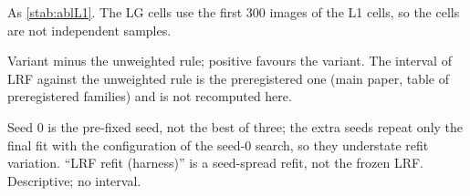 \documentclass[journal,onecolumn]{IEEEtran}
\theoremstyle{plain}
\begin{document}
\begin{table}[!htbp]
\centering
\caption{Exploratory Ablation: Accuracy and Difference From the Frozen LRF, LG Cells (the First 300 L1 Images)}
\label{stab:ablLG}
\scriptsize
\setlength{\tabcolsep}{3pt}
\resizebox{\textwidth}{!}{}

\vspace{2pt}
\parbox{\textwidth}{\scriptsize As \cref{stab:ablL1}. The LG cells use the first 300 images of the L1 cells, so the cells are not
independent samples.}
\end{table}

\begin{table}[!htbp]
\centering
\caption{Exploratory Ablation: Difference From the Unweighted Rule [95\% Interval], All Cells}
\label{stab:ablnone}
\scriptsize
\setlength{\tabcolsep}{2pt}
\resizebox{\textwidth}{!}{}

\vspace{2pt}
\parbox{\textwidth}{\scriptsize Variant minus the unweighted rule; positive favours the variant. The interval of LRF against the
unweighted rule is the preregistered one (main paper, table of preregistered families) and is not recomputed here.}
\end{table}

\begin{table}[!htbp]
\centering
\caption{Exploratory Ablation: Seed-Spread Refits (Accuracy at Seeds 0, 1, 2; Mean, SD, Range)}
\label{stab:ablseeds}
\scriptsize
\setlength{\tabcolsep}{2pt}
\resizebox{\textwidth}{!}{}

\vspace{2pt}
\parbox{\textwidth}{\scriptsize Seed 0 is the pre-fixed seed, not the best of three; the extra seeds repeat only the final fit with the
configuration of the seed-0 search, so they understate refit variation. ``LRF refit (harness)'' is a seed-spread refit, not the frozen
LRF. Descriptive; no interval.}
\end{table}
\end{document}
